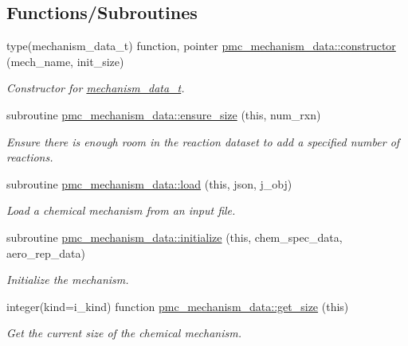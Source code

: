\subsection*{Functions/\+Subroutines}
\begin{DoxyCompactItemize}
\item 
type(mechanism\+\_\+data\+\_\+t) function, pointer \mbox{\hyperlink{namespacepmc__mechanism__data_a35bbe32d1c1cb03b3add4d988d3f80e6}{pmc\+\_\+mechanism\+\_\+data\+::constructor}} (mech\+\_\+name, init\+\_\+size)
\begin{DoxyCompactList}\small\item\em Constructor for \mbox{\hyperlink{structpmc__mechanism__data_1_1mechanism__data__t}{mechanism\+\_\+data\+\_\+t}}. \end{DoxyCompactList}\item 
subroutine \mbox{\hyperlink{namespacepmc__mechanism__data_abe6f1501c5d5d66d04993b54b142521f}{pmc\+\_\+mechanism\+\_\+data\+::ensure\+\_\+size}} (this, num\+\_\+rxn)
\begin{DoxyCompactList}\small\item\em Ensure there is enough room in the reaction dataset to add a specified number of reactions. \end{DoxyCompactList}\item 
subroutine \mbox{\hyperlink{namespacepmc__mechanism__data_a7ada5b071666b6eaf2fde27f8866cbdf}{pmc\+\_\+mechanism\+\_\+data\+::load}} (this, json, j\+\_\+obj)
\begin{DoxyCompactList}\small\item\em Load a chemical mechanism from an input file. \end{DoxyCompactList}\item 
subroutine \mbox{\hyperlink{namespacepmc__mechanism__data_af37833fbb878f0add05d26cdbaa5cd33}{pmc\+\_\+mechanism\+\_\+data\+::initialize}} (this, chem\+\_\+spec\+\_\+data, aero\+\_\+rep\+\_\+data)
\begin{DoxyCompactList}\small\item\em Initialize the mechanism. \end{DoxyCompactList}\item 
integer(kind=i\+\_\+kind) function \mbox{\hyperlink{namespacepmc__mechanism__data_ad347eb7b2faed074dd4a83a35f6a3559}{pmc\+\_\+mechanism\+\_\+data\+::get\+\_\+size}} (this)
\begin{DoxyCompactList}\small\item\em Get the current size of the chemical mechanism. \end{DoxyCompactList}\item 

\end{DoxyCompactItemize}
